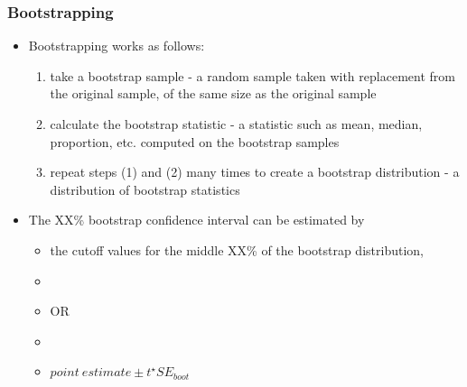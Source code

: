 \documentclass[11pt,containsverbatim,handout,xcolor=xelatex,dvipsnames,table]{beamer}
\begin{document}
\begin{frame}
\frametitle{Bootstrapping}

\begin{itemize}

\item Bootstrapping works as follows:
\pause
\begin{enumerate}[(1)]
\item take a bootstrap sample - a random sample taken with replacement from the original sample, of the 
same size as the original sample
\pause
\item calculate the bootstrap statistic - a statistic such as mean, median, proportion, etc. computed on the 
bootstrap samples
\pause
\item repeat steps (1) and (2) many times to create a bootstrap distribution - a distribution of bootstrap statistics
\end{enumerate}

\pause

\item The XX\% bootstrap confidence interval can be estimated by
\begin{itemize}
\pause
\item the cutoff values for the middle XX\% of the bootstrap distribution,
\item[]
\pause
\item[] OR
\item[]
\pause
\item $point~estimate \pm t^\star SE_{boot}$
\end{itemize}

\end{itemize}

\end{frame}

\end{document}
